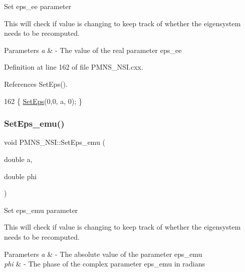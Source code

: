 Set eps\+\_\+ee parameter

This will check if value is changing to keep track of whether the eigensystem needs to be recomputed.


\begin{DoxyParams}{Parameters}
{\em a} & -\/ The value of the real parameter eps\+\_\+ee \\
\hline
\end{DoxyParams}


Definition at line 162 of file P\+M\+N\+S\+\_\+\+N\+S\+I.\+cxx.



References Set\+Eps().


\begin{DoxyCode}
162 \{ \hyperlink{classOscProb_1_1PMNS__NSI_a87c508149ea36b6de493a6817247a0ea}{SetEps}(0,0, a, 0); \}
\end{DoxyCode}
\mbox{\label{classOscProb_1_1PMNS__NSI_ad5fccd151aea7c673c516b8686f8253c}} 
\subsubsection{\texorpdfstring{Set\+Eps\+\_\+emu()}{SetEps\_emu()}}
{\footnotesize\ttfamily void P\+M\+N\+S\+\_\+\+N\+S\+I\+::\+Set\+Eps\+\_\+emu (\begin{DoxyParamCaption}\item[{double}]{a,  }\item[{double}]{phi }\end{DoxyParamCaption})\hspace{0.3cm}{\ttfamily [virtual]}}

Set eps\+\_\+emu parameter

This will check if value is changing to keep track of whether the eigensystem needs to be recomputed.


\begin{DoxyParams}{Parameters}
{\em a} & -\/ The absolute value of the parameter eps\+\_\+emu \\
\hline
{\em phi} & -\/ The phase of the complex parameter eps\+\_\+emu in radians \\
\hline
\end{DoxyParams}


